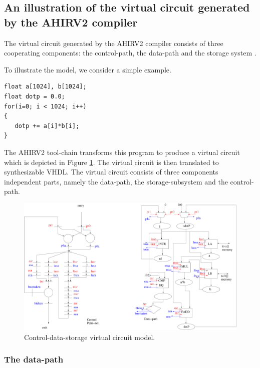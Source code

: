 \documentclass[conference]{IEEEtran}
\begin{document}
\subsection{An illustration of the virtual circuit generated by the AHIRV2 compiler}

The virtual circuit generated by the AHIRV2 compiler consists of three
cooperating components: the control-path, the data-path and
the storage system \cite{c:ahir_dsd2010,c:ahir_usenix2012}.

To illustrate the model, we consider a simple example.
\begin{verbatim}
float a[1024], b[1024];
float dotp = 0.0;
for(i=0; i < 1024; i++)
{
   dotp += a[i]*b[i];
}
\end{verbatim}
The AHIRV2 tool-chain transforms this program to 
produce a virtual circuit which is depicted in Figure \ref{fig:dotP}. The
virtual circuit is then translated to synthesizable VHDL.
The virtual circuit consists of three components independent parts, namely
the data-path, the storage-subsystem and the control-path.

\begin{figure}[ht]
  \centering
  \includegraphics[width=\linewidth]{dotP.pdf}
  \caption{Control-data-storage virtual circuit model.}
  \label{fig:dotP}
\end{figure}



\subsubsection{The data-path}
\end{document}
